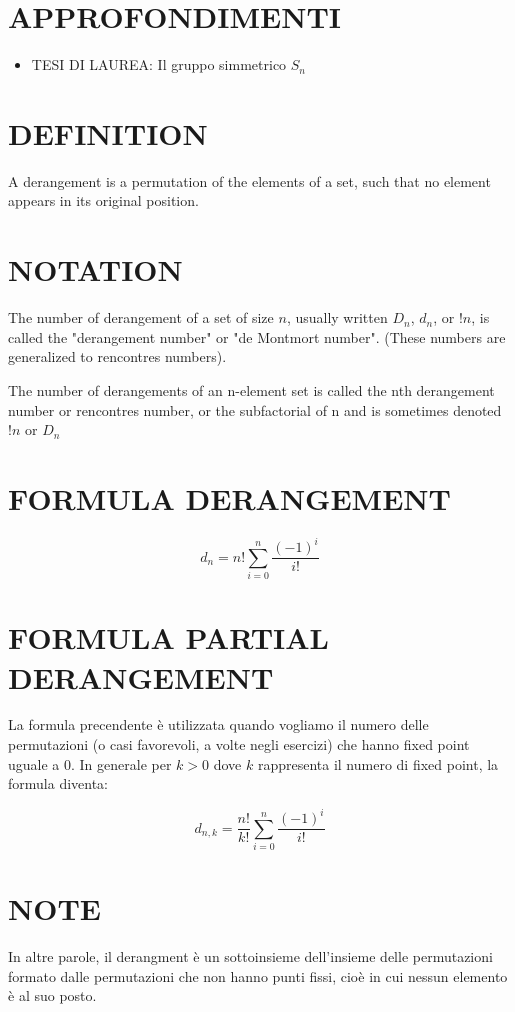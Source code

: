 \section{APPROFONDIMENTI}
\begin{itemize}
 \item TESI DI LAUREA: Il gruppo simmetrico $S_{n}$ \cite{simmetrico1}
\end{itemize}




\section{DEFINITION}
A derangement is a permutation of the elements of a set, such that no element appears in its original 
position. \cite{derangement}

\section{NOTATION}
The number of derangement of a set of size $n$, usually written $D_{n}$, $d_{n}$, or $!n$, is called the "derangement number" or
"de Montmort number". (These numbers are generalized to rencontres numbers). \cite{derangement}

The number of derangements of an n-element set is called the nth derangement number or rencontres number, or the subfactorial
of n and is sometimes denoted $!n$ or $D_{n}$

\section{FORMULA DERANGEMENT}
\[
 d_{n} = n!\sum^{n}_{i=0} \frac{(-1)^i}{i!}
\]

\section{FORMULA PARTIAL DERANGEMENT}
La formula precendente è utilizzata quando vogliamo il numero delle permutazioni (o casi favorevoli, a volte negli esercizi) che hanno fixed point uguale a 0.
In generale per $k>0$ dove $k$ rappresenta il numero di fixed point, la formula diventa:

\[
 d_{n,k} = \frac{n!}{k!}\sum^{n}_{i=0} \frac{(-1)^i}{i!}
\]

\section{NOTE}
In altre parole, il derangment è un sottoinsieme dell'insieme delle permutazioni formato dalle permutazioni che non hanno punti fissi, cioè 
in cui nessun elemento è al suo posto.

